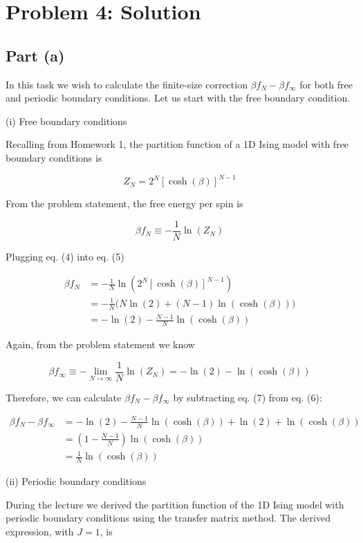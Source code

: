 ﻿\documentclass[11pt]{article}
\begin{document}
    \section*{Problem 4: Solution}\label{problem-4-solution}

    \subsection*{Part (a)}

In this task we wish to calculate the finite-size correction
\(\beta f_N - \beta f_{\infty}\) for both free and periodic boundary
conditions. Let us start with the free boundary condition.

(i) Free boundary conditions

Recalling from Homework 1, the partition function of a 1D Ising model
with free boundary conditions is

\[
\boxed{Z_N=2^N\left[\cosh(\beta)\right]^{N-1}} \tag{4}
\]

From the problem statement, the free energy per spin is

\[
\beta f_N \equiv -\frac{1}{N}\ln(Z_N) \tag{5}
\]

Plugging eq. (4) into eq. (5)

\[
\begin{aligned}
\beta f_N &= -\frac{1}{N}\ln\left(2^N\left[\cosh(\beta)\right]^{N-1}\right)\\
&= -\frac{1}{N}\Big(N\ln(2)+(N-1)\ln(\cosh(\beta))\Big)\\
&= -\ln(2)-\frac{N-1}{N}\ln(\cosh(\beta))
\end{aligned} \tag{6}
\]

Again, from the problem statement we know

\[
\beta f_{\infty} \equiv -\lim_{N \to \infty} \frac{1}{N}\ln(Z_N)=-\ln(2)-\ln(\cosh(\beta)) \tag{7}
\]

Therefore, we can calculate \(\beta f_N - \beta f_{\infty}\) by
subtracting eq. (7) from eq. (6):

\[
\begin{aligned}
\beta f_N - \beta f_{\infty} &= -\ln(2)-\frac{N-1}{N}\ln(\cosh(\beta))+\ln(2)+\ln(\cosh(\beta))\\
&= \left(1-\frac{N-1}{N}\right)\ln(\cosh(\beta))\\
&= \boxed{\frac{1}{N}\ln(\cosh(\beta))}
\end{aligned} \tag{8}
\]

(ii) Periodic boundary conditions

During the lecture we derived the partition function of the 1D Ising
model with periodic boundary conditions using the transfer matrix
method. The derived expression, with \(J=1\), is
\end{document}
